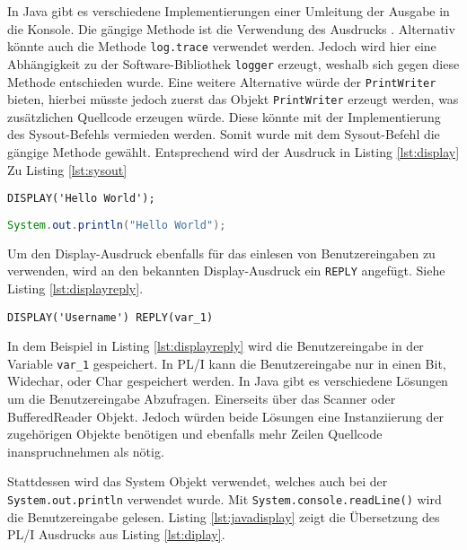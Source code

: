 In Java gibt es verschiedene Implementierungen einer Umleitung der Ausgabe in die Konsole.
Die gängige Methode ist die Verwendung des Ausdrucks . 
Alternativ könnte auch die Methode \verb+log.trace+ verwendet werden.
Jedoch wird hier eine Abhängigkeit zu der Software-Bibliothek \verb+logger+  erzeugt, weshalb sich gegen diese Methode entschieden wurde.
Eine weitere Alternative würde der \verb+PrintWriter+ bieten, hierbei müsste jedoch zuerst das Objekt \verb+PrintWriter+ erzeugt werden, was zusätzlichen Quellcode erzeugen würde. Diese könnte mit der Implementierung des Sysout-Befehls vermieden werden.
Somit wurde mit dem Sysout-Befehl die gängige Methode gewählt. Entsprechend wird der Ausdruck in Listing \ref{lst:display} Zu Listing \ref{lst:sysout}

\begin{lstlisting}[language=PL/I, caption=Display-Statments, label={lst:display}]
DISPLAY('Hello World');
\end{lstlisting} 

\begin{lstlisting}[language=Java, caption=\"Ubersetzung des Display-Statments, label={lst:sysout}]
System.out.println("Hello World");
\end{lstlisting} 

Um den Display-Ausdruck ebenfalls für das einlesen von Benutzereingaben zu verwenden, wird an den bekannten Display-Ausdruck ein \verb+REPLY+ angefügt. Siehe Listing \ref{lst:displayreply}.

\begin{lstlisting}[language=PL/I, caption=Display-Reply-Statments, label={lst:displayreply}]
DISPLAY('Username') REPLY(var_1)
\end{lstlisting} 

In dem Beispiel in Listing \ref{lst:displayreply} wird die Benutzereingabe in der
Variable \verb+var_1+ gespeichert.
In PL/I kann die Benutzereingabe nur in einen Bit, Widechar, oder Char gespeichert
werden. 
In Java gibt es verschiedene Lösungen um die Benutzereingabe Abzufragen.
Einerseits über das Scanner oder BufferedReader Objekt.
Jedoch würden beide Lösungen eine Instanziierung der zugehörigen Objekte benötigen und ebenfalls mehr Zeilen Quellcode inanspruchnehmen als nötig.

Stattdessen wird das System Objekt verwendet, welches auch bei der \verb+System.out.println+ verwendet wurde.
Mit \verb+System.console.readLine()+ wird die Benutzereingabe gelesen.
Listing \ref{lst:javadisplay} zeigt die Übersetzung des PL/I Ausdrucks aus Listing \ref{lst:diplay}.

